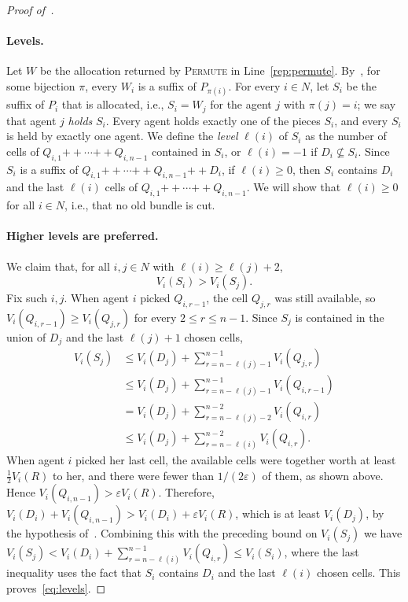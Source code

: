 \documentclass[11pt]{article}
\newcommand{\eps}{\varepsilon}
\newcommand{\Permute}{\textsc{Permute}}
\newcommand{\cat}{\mathbin{+\!\!+}}
\theoremstyle{plain}
\theoremstyle{definition}
\theoremstyle{plain}
\begin{document}
\begin{proof}[Proof of~]
\paragraph{Levels.}
Let $W$ be the allocation returned by \Permute{} in Line~\ref{rep:permute}. By~, for some bijection $\pi$, every $W_i$ is a suffix of $P_{\pi(i)}$. For every $i \in N$, let $S_i$ be the suffix of $P_i$ that is allocated, i.e., $S_i = W_j$ for the agent $j$ with $\pi(j)=i$; we say that agent $j$ \emph{holds} $S_i$. Every agent holds exactly one of the pieces $S_i$, and every $S_i$ is held by exactly one agent. We define the \emph{level} $\ell(i)$ of $S_i$ as the number of cells of $Q_{i,1}\cat\cdots\cat Q_{i,n-1}$ contained in $S_i$, or $\ell(i) = -1$ if $D_i \not\subseteq S_i$. Since $S_i$ is a suffix of $Q_{i,1}\cat\cdots\cat Q_{i,n-1}\cat D_i$, if $\ell(i)\ge0$, then $S_i$ contains $D_i$ and the last $\ell(i)$ cells of $Q_{i,1}\cat\cdots\cat Q_{i,n-1}$. We will show that $\ell(i) \ge 0$ for all $i \in N$, i.e., that no old bundle is cut.

\paragraph{Higher levels are preferred.}
We claim that, for all $i,j\in N$ with $\ell(i)\ge\ell(j)+2$,
\begin{equation}\label{eq:levels}
V_i(S_i)>V_i(S_j).
\end{equation}
Fix such $i,j$. When agent $i$ picked $Q_{i,r-1}$, the cell $Q_{j,r}$ was still available, so $V_i(Q_{i,r-1})\ge V_i(Q_{j,r})$ for every $2\le r \le n-1$. Since $S_j$ is contained in the union of $D_j$ and the last $\ell(j)+1$ chosen cells,
\begin{align*}
V_i(S_j)
&\le V_i(D_j)+\sum_{r=n-\ell(j)-1}^{n-1}V_i(Q_{j,r})\\
&\le V_i(D_j)+\sum_{r=n-\ell(j)-1}^{n-1}V_i(Q_{i,r-1})
\tag{Round robin}\\
&= V_i(D_j)+\sum_{r=n-\ell(j)-2}^{n-2}V_i(Q_{i,r})
\tag{Re-indexing}\\
&\le V_i(D_j)+\sum_{r=n-\ell(i)}^{n-2}V_i(Q_{i,r}).
\tag{$\ell(i)\ge\ell(j)+2$}
\end{align*}
When agent $i$ picked her last cell, the available cells were together worth at least $\frac12 V_i(R)$ to her, and there were fewer than $1/(2\eps)$ of them, as shown above. Hence $V_i(Q_{i,n-1})>\eps V_i(R)$. Therefore, $V_i(D_i)+V_i(Q_{i,n-1}) > V_i(D_i)+\eps V_i(R)$, which is at least $V_i(D_j)$, by the hypothesis of~. Combining this with the preceding bound on $V_i(S_j)$ we have $V_i(S_j)< V_i(D_i)+\sum_{r=n-\ell(i)}^{n-1}V_i(Q_{i,r}) \le V_i(S_i)$, where the last inequality uses the fact that $S_i$ contains $D_i$ and the last $\ell(i)$ chosen cells. This proves~\eqref{eq:levels}.



\end{proof}
\end{document}
